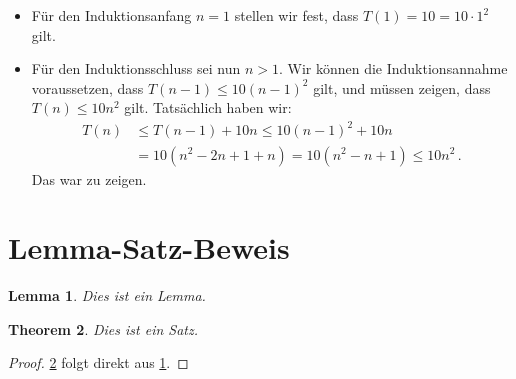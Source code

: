 \documentclass[a4paper,11pt,oneside,ngerman]{scrartcl}
\theoremstyle{plain}
\newtheorem{lemma}{Lemma}
\newtheorem{theorem}[lemma]{Theorem}
\theoremstyle{definition}
\begin{document}
\begin{itemize}
  \item Für den Induktionsanfang $n=1$ stellen wir fest, dass $T(1)=10=10 \cdot 1^2$ gilt.
  \item Für den Induktionsschluss sei nun $n>1$. Wir können die Induktionsannahme voraussetzen, dass $T(n-1)\le 10 (n-1)^2$ gilt, und müssen zeigen, dass $T(n)\le 10n^2$ gilt. Tatsächlich haben wir:
  \begin{align*}
    T(n) &\le T(n-1)+10n
    \le 10(n-1)^2 + 10n\\
    &= 10 (n^2-2n+1+n)
    = 10 (n^2-n+1) \le 10 n^2\,.
  \end{align*}
  Das war zu zeigen.
\end{itemize}

\section*{Lemma-Satz-Beweis}

\begin{lemma}\label{my-lemma}
Dies ist ein Lemma.
\end{lemma}
\begin{theorem}\label{my-theorem}
    Dies ist ein Satz.
\end{theorem}
\begin{proof}
    \cref{my-theorem} folgt direkt aus \cref{my-lemma}.
\end{proof}



\end{document}
